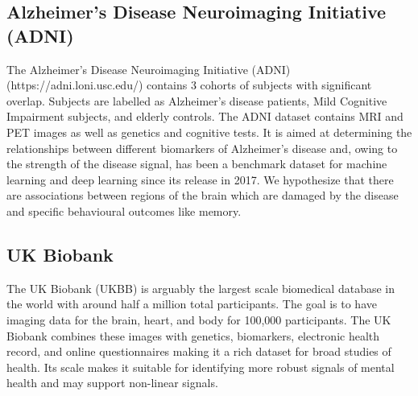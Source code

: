 \subsection{Alzheimer's Disease Neuroimaging Initiative (ADNI)}

The Alzheimer's Disease Neuroimaging Initiative (ADNI) (https://adni.loni.usc.edu/) contains 3 cohorts of subjects with significant overlap. Subjects are labelled as Alzheimer's disease patients, Mild Cognitive Impairment subjects, and elderly controls. The ADNI dataset contains MRI and PET images as well as genetics and cognitive tests. It is aimed at determining the relationships between different biomarkers of Alzheimer's disease and, owing to the strength of the disease signal, has been a benchmark dataset for machine learning and deep learning since its release in 2017. We hypothesize that there are associations between regions of the brain which are damaged by the disease and specific behavioural outcomes like memory.

\subsection{UK Biobank}
The UK Biobank (UKBB) is arguably the largest scale biomedical database in the world with around half a million total participants. The goal is to have imaging data for the brain, heart, and body for 100,000 participants. The UK Biobank combines these images with genetics, biomarkers, electronic health record, and online questionnaires making it a rich dataset for broad studies of health. Its scale makes it suitable for identifying more robust signals of mental health and may support non-linear signals.



 




